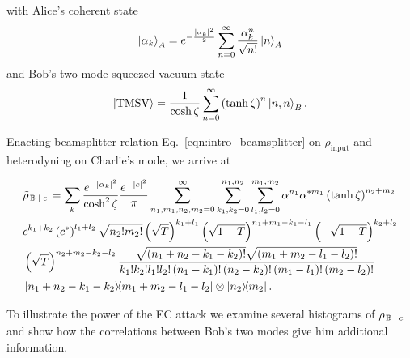 \noindent with Alice's coherent state
\begin{equation}
\ket{\alpha_k}_A = e^{- \frac{\left| \alpha_k \right|^2}{2}} \sum_{n=0}^\infty \frac{\alpha_k^n}{\sqrt{n!}} \ket{n}_A
\end{equation}
and Bob's two-mode squeezed vacuum state
\begin{equation}
\ket{\text{TMSV}} = \frac{1}{\cosh{\zeta}}\sum_{n=0}^\infty \left(\tanh{\zeta}\right)^n \ket{n, n}_B.
\end{equation}

\noindent Enacting beamsplitter relation Eq.~\ref{eqn:intro_beamsplitter} on $\rho_{\text{input}}$ and heterodyning on Charlie's mode, we arrive at 

\begin{align}
&\tilde{\rho}_{\left. \mathbb{B} \given c\right.} = \sum_k\frac{e^{- \left|\alpha_k\right|^2}}{\cosh^2 \zeta}\frac{e^{-\left|c\right|^2}}{\pi} \sum_{n_1, m_1, n_2, m_2=0}^\infty \sum_{k_1, k_2 = 0}^{n_1, n_2} \sum_{l_1, l_2 = 0}^{m_1, m_2} \alpha^{n_1} \alpha^{* m_1} \left(\tanh{\zeta}\right)^{n_2 + m_2} \notag \\
%
&c^{k_1 + k_2} \left(c^*\right)^{l_1 + l_2} \sqrt{n_2! m_2!} \left(\sqrt{T}\right)^{k_1 + l_1} \left(\sqrt{1-T}\right)^{n_1 + m_1 - k_1 - l_1} \left(- \sqrt{1-T}\right)^{k_2 + l_2} \notag \\ %
&\left( \sqrt{T}\right)^{n_2 + m_2 - k_2 - l_2}
\frac{\sqrt{\left(n_1 + n_2 - k_1 - k_2\right)!} \sqrt{\left(m_1 + m_2 - l_1 - l_2\right)!}}{k_1! k_2! l_1! l_2! \left(n_1 - k_1\right)! \left(n_2 - k_2\right)! \left(m_1 - l_1\right)! \left(m_2 - l_2\right)!} \notag \\
%
& \dyad{n_1 + n_2 - k_1 - k_2}{m_1 + m_2 - l_1 - l_2}\otimes \dyad{n_2}{m_2}.
\end{align}

To illustrate the power of the EC attack we examine several histograms of $\rho_{\left. \mathbb{B} \; \middle| \; c\right.}$ and show how the correlations between Bob's two modes give him additional information. 





